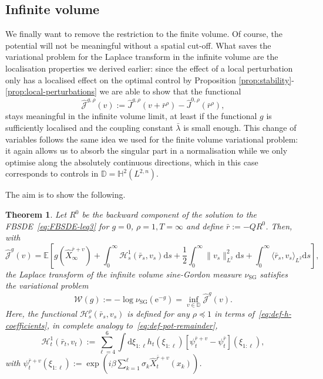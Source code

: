 \documentclass[11pt, a4paper]{scrartcl}
\numberwithin{equation}{section}
\theoremstyle{plain}
\newtheorem{theorem}[foo]{Theorem}
\theoremstyle{remark}
\newcommand{\assign}{:=}
\newcommand{\mathd}{\mathrm{d}}
\newcommand{\mathe}{\mathrm{e}}
\newcommand{\tmop}[1]{\ensuremath{\operatorname{#1}}}
\begin{document}
\subsection{Infinite volume}

We finally want to remove the restriction to the finite volume. Of course, the
potential will not be meaningful without a spatial cut-off. What saves the
variational problem for the Laplace transform in the infinite volume are the
localisation properties we derived earlier: since the effect of a local
perturbation only has a localised effect on the optimal control by Proposition
\ref{prop:stability}-\ref{prop:local-perturbations} we are able to show that
the functional
\[ \hat{\mathcal{J}}^{g, \rho} (v) \assign \hat{J}^{g, \rho} (v +
   \bar{r}^{\rho}) - \hat{J}^{0, \rho} (\bar{r}^{\rho}), \]
stays meaningful in the infinite volume limit, at least if the functional $g$
is sufficiently localised and the coupling constant $\bar{\lambda}$ is small enough.
This change of variables follows the same idea we used for the finite volume
variational problem: it again allows us to absorb the singular part in a
normalisation while we only optimise along the absolutely continuous directions,
which in this case corresponds to controls in $\mathbb{D}=\mathbb{H}^2 (L^{2,
n})$.

The aim is to show the following.

\begin{theorem}
  \label{thm:infinite-vol-var}Let $R^0$ be the backward component of the
  solution to the FBSDE~\eqref{eq:FBSDE-leq3} for $g = 0$, $\rho = 1, T =
  \infty$ and define $\bar{r} \assign -QR^0$. Then, with
  \[ \hat{\mathcal{J}}^g (v) =\mathbb{E} \left[ g (\hat{X}_{\infty}^{\bar{r} +
     v}) + \int_0^{\infty} \mathcal{H}_s^1 (\bar{r}_s, v_s) \mathd s +
     \frac{1}{2} \int_0^{\infty} \| v_s \|^2_{L^2} \mathd s + \int_0^{\infty}
     \langle \bar{r}_s, v_s \rangle_{L^2} \mathd s \right], \]
  the Laplace transform of the infinite volume sine-Gordon measure
  $\nu_{\tmop{SG}}$ satisfies the variational problem
  \[ \mathcal{W} (g) \assign - \log \nu_{\tmop{SG}} (\mathe^{- g}) = \inf_{v
     \in \mathbb{D}}  \hat{\mathcal{J}}^g (v) . \]
  Here, the functional $\mathcal{H}_s^{\rho} (\bar{r}_s, v_s)$ is defined for
  any $\rho \preceq  1$ in terms of~\eqref{eq:def-h-coefficients}, in
  complete analogy to~\eqref{eq:def-pot-remainder},
  \[ \mathcal{H}_t^1 (\bar{r}_t, v_t) \assign \sum_{\ell = 4}^6 \int \mathd
     \xi_{1 : \ell} h_t (\xi_{1 : \ell}) [\psi^{\bar{r} + v}_t -
     \psi^{\bar{r}}_t] (\xi_{1 : \ell}), \]
  with $\psi^{\bar{r} + v}_t (\xi_{1 : \ell}) \assign \exp \left( i \beta
  \sum_{k = 1}^{\ell} \sigma_k  \hat{X}_t^{\bar{r} + v} (x_k) \right)$.
\end{theorem}
\end{document}
